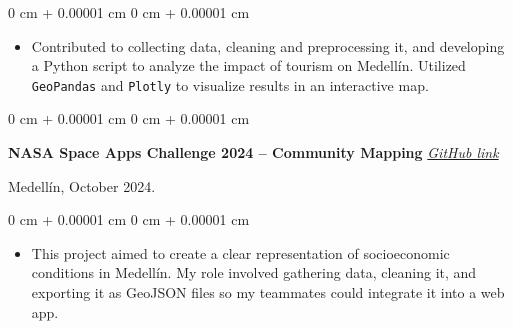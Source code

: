 \documentclass[10pt, letterpaper]{article}
\newenvironment{highlights}{
    \begin{itemize}[
        topsep=0.10 cm,
        parsep=0.10 cm,
        partopsep=0pt,
        itemsep=0pt,
        leftmargin=0 cm + 10pt
    ]
}{
    \end{itemize}
}
\newenvironment{onecolentry}{
    \begin{adjustwidth}{
        0 cm + 0.00001 cm
    }{
        0 cm + 0.00001 cm
    }
}{
    \end{adjustwidth}
}
\newenvironment{twocolentry}[2][]{
    \onecolentry
    \def\secondColumn{#2}
    \setcolumnwidth{\fill, 4.5 cm}
    \begin{paracol}{2}
}{
    \switchcolumn \raggedleft \secondColumn
    \end{paracol}
    \endonecolentry
}
\begin{document}
    \vspace{0.10 cm}
    \begin{onecolentry}
        \begin{highlights}
            \item Contributed to collecting data, cleaning and preprocessing it, and developing a Python script to analyze the impact of tourism on Medellín. Utilized \texttt{GeoPandas} and \texttt{Plotly} to visualize results in an interactive map.
        \end{highlights}
    \end{onecolentry}

    \begin{twocolentry}{
        Medellín, October 2024.
    }
        \textbf{NASA Space Apps Challenge 2024 -- Community Mapping} 
        \textit{\href{https://github.com/tonnysoyyo/NASA-Space-Apps}{GitHub link}}
    \end{twocolentry}

    \vspace{0.10 cm}
    \begin{onecolentry}
        \begin{highlights}
            \item This project aimed to create a clear representation of socioeconomic conditions in Medellín. My role involved gathering data, cleaning it, and exporting it as GeoJSON files so my teammates could integrate it into a web app.
        \end{highlights}
    \end{onecolentry}
\end{document}
